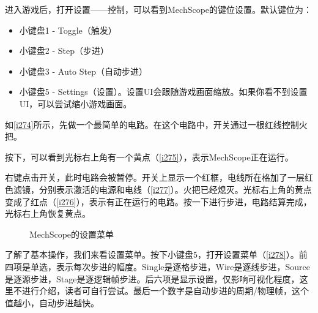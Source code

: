 进入游戏后，打开设置——控制，可以看到MechScope的键位设置。默认键位为：
\begin{itemize}
  \item 小键盘1 - Toggle（触发）
  \item 小键盘2 - Step（步进）
  \item 小键盘3 - Auto Step（自动步进）
  \item 小键盘5 - Settings（设置）。设置UI会跟随游戏画面缩放。如果你看不到设置UI，可以尝试缩小游戏画面。
\end{itemize}

如\autoref{i274}所示，先做一个最简单的电路。在这个电路中，开关通过一根红线控制火把。

\begin{figure}[!ht]
  \centering
  \caption{}
\end{figure}

按下，可以看到光标右上角有一个黄点（\autoref{i275}），表示MechScope正在运行。

\begin{figure}
  \centering
  \qquad
  \caption{}
\end{figure}

右键点击开关，此时电路会被暂停。开关上显示一个红框，电线所在格加了一层红色滤镜，分别表示激活的电源和电线（\autoref{i277}）。火把已经熄灭。光标右上角的黄点变成了红点（\autoref{i276}），表示有正在运行的电路。按一下进行步进，电路结算完成，光标右上角恢复黄点。

\begin{figure}[H]
  \centering
  \caption{MechScope的设置菜单}\label{i278}
\end{figure}

了解了基本操作，我们来看设置菜单。按下小键盘5，打开设置菜单（\autoref{i278}）。前四项是单选，表示每次步进的幅度。Single是逐格步进，Wire是逐线步进，Source是逐源步进，Stage是逐逻辑帧步进。后六项是显示设置，仅影响可视化程度，这里不进行介绍，读者可自行尝试。最后一个数字是自动步进的周期/物理帧，这个值越小，自动步进越快。

